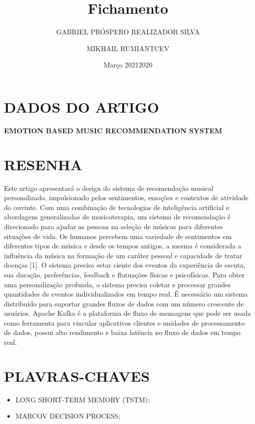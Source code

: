 \documentclass{article}
\title{Fichamento}
\author{GABRIEL PRÓSPERO REALIZADOR  SILVA}
\date{Março 2021}
\begin{document}
\maketitle

\section{DADOS DO ARTIGO}
\textbf{EMOTION BASED MUSIC RECOMMENDATION SYSTEM \\}
\author{MIKHAIL RUMIANTCEV \\}
\date{2020}

\section{RESENHA}
Este artigo apresentará o design do sistema de recomendação musical personalizado, impulsionado pelos sentimentos, emoções e contextos de atividade do ouvinte. Com uma combinação de tecnologias de inteligência artificial e abordagens generalizadas de musicoterapia, um sistema de recomendação é direcionado para ajudar as pessoas na seleção de músicas para diferentes situações de vida. Os humanos percebem uma variedade de sentimentos em diferentes tipos de música e desde os tempos antigos, a mesma é considerada a influência da música na formação de um caráter pessoal e capacidade de tratar doenças [1]. O sistema precisa estar ciente dos eventos da experiência de escuta, sua duração, preferências, feedback e flutuações físicas e psicofísicas. Para obter uma personalização profunda, o sistema precisa coletar e processar grandes quantidades de eventos individualizados em tempo real. É necessário um sistema distribuído para suportar grandes fluxos de dados com um número crescente de usuários. Apache Kafka é a plataforma de fluxo de mensagens que pode ser usada como ferramenta para vincular aplicativos clientes e unidades de processamento de dados, possui alto rendimento e baixa latência no fluxo de dados em tempo real. 

\section{PLAVRAS-CHAVES}
\begin{itemize}
    \item LONG SHORT-TERM MEMORY (TSTM); 
    \item MARCOV DECISION PROCESS;
\end{itemize}
\end{document}
